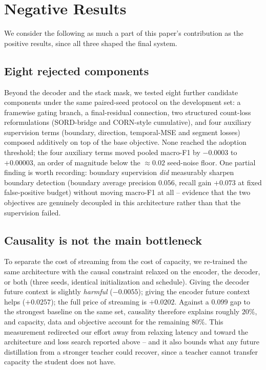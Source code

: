 \documentclass[journal]{IEEEtran}
\begin{document}
\section{Negative Results}
\label{sec:negative}

We consider the following as much a part of this paper's contribution as the
positive results, since all three shaped the final system.

\subsection{Eight rejected components}
Beyond the decoder and the stack mask, we tested eight further candidate
components under the same paired-seed protocol on the development set: a
framewise gating branch, a final-residual connection, two structured
count-loss reformulations (SORD-bridge and CORN-style cumulative), and four
auxiliary supervision terms (boundary, direction, temporal-MSE and segment
losses) composed additively on top of the base objective. None reached the
adoption threshold; the four auxiliary terms moved pooled macro-F1 by
$-0.0003$ to $+0.00003$, an order of magnitude below the $\approx\!0.02$
seed-noise floor. One partial finding is worth recording: boundary
supervision \emph{did} measurably sharpen boundary detection (boundary
average precision $0.056$, recall gain $+0.073$ at fixed false-positive
budget) without moving macro-F1 at all -- evidence that the two objectives
are genuinely decoupled in this architecture rather than that the
supervision failed.

\subsection{Causality is not the main bottleneck}
To separate the cost of streaming from the cost of capacity, we re-trained
the same architecture with the causal constraint relaxed on the encoder,
the decoder, or both (three seeds, identical initialization and schedule).
Giving the decoder future context is slightly \emph{harmful}
($-0.0055$); giving the encoder future context helps ($+0.0257$); the full
price of streaming is $+0.0202$. Against a $0.099$ gap to the strongest
baseline on the same set, causality therefore explains roughly $20\%$, and
capacity, data and objective account for the remaining $80\%$. This measurement
redirected our effort away from relaxing latency and toward the architecture
and loss search reported above -- and it also bounds what any future
distillation from a stronger teacher could recover, since a teacher cannot
transfer capacity the student does not have.
\end{document}
